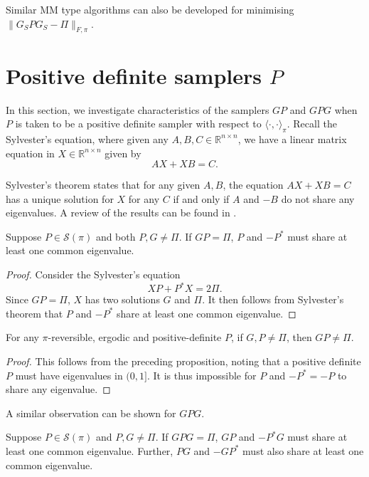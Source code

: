 \documentclass[EJP]{ejpecp} %
\begin{document}
Similar MM type algorithms can also be developed for minimising $\|G_{S}P G_S - \Pi\|_{F, \pi}$.

\section{Positive definite samplers $P$} \label{sec:posdef}
In this section, we investigate characteristics of the samplers $GP$ and $GPG$ when $P$ is taken to be a positive definite sampler with respect to $\langle \cdot,\cdot \rangle_\pi.$ Recall the Sylvester's equation, where given any $A,B,C \in \mathbb{R}^{n\times n}$, we have a linear matrix equation in $X \in \mathbb{R}^{n\times n}$ given by 
$$AX + XB = C.$$

Sylvester's theorem states that for any given $A, B$, the equation $AX + XB = C$ has a unique solution for $X$ for any $C$ if and only if $A$ and $-B$ do not share any eigenvalues. A review of the results can be found in \cite[Theorem 2.4.4.1]{Horn_Johnson_1991}.

\begin{proposition}
    Suppose $P \in \mathcal{S}(\pi)$ and both $P, G \neq \Pi$. If $GP = \Pi$, $P$ and $-P^*$ must share at least one common eigenvalue.   
\end{proposition}

\begin{proof}
    Consider the Sylvester's equation 
    $$XP + P^*X = 2\Pi.$$
    Since $GP = \Pi$, $X$ has two solutions $G$ and $\Pi$. It then follows from Sylvester's theorem that $P$ and $-P^*$ share at least one common eigenvalue.
\end{proof}

\begin{corollary}
    For any $\pi$-reversible, ergodic and positive-definite $P$, if $G, P \neq \Pi$, then $GP \neq \Pi.$
\end{corollary}

\begin{proof}
    This follows from the preceding proposition, noting that a positive definite $P$ must have eigenvalues in $(0,1]$. It is thus impossible for $P$ and $-P^* = -P$ to share any eigenvalue. 
\end{proof}

A similar observation can be shown for $GPG$.

\begin{proposition}
    Suppose $P \in \mathcal{S}(\pi)$ and $P, G \neq \Pi$. If $GPG = \Pi$, $GP$ and $-P^*G$ must share at least one common eigenvalue. Further, $PG$ and $-GP^*$ must also share at least one common eigenvalue. 
\end{proposition}
\end{document}
